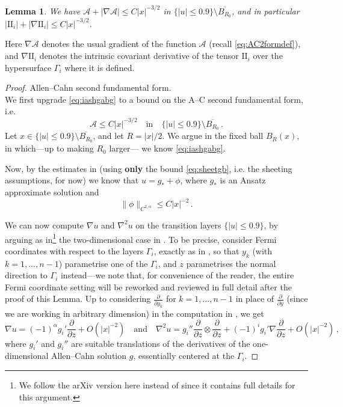 \documentclass{article}
\newtheorem{lemma}[theorem]{Lemma}
\theoremstyle{definition}
\begin{document}
\begin{lemma}\label{lem:2ffdec} We have
$\mathcal A+|\nabla \mathcal A|\leq C|x|^{-3/2}$ in $\{|u|\leq 0.9\}\setminus\overline{B_{R_0}}$, and in particular
$|\mathrm{II}_i|+|\nabla \mathrm{II}_i|\leq C|x|^{-3/2}$.
\end{lemma}
Here $\nabla \mathcal A$ denotes the usual gradient of the function $\mathcal A$ (recall \eqref{eq:AC2formdef}), and $\nabla \mathrm{II}_i$ denotes the intrinsic covariant derivative of the tensor $\mathrm{II}_i$ over the hypersurface $\Gamma_i$ where it is defined.
\begin{proof} 
 Allen--Cahn second fundamental form.\\
    We first upgrade \eqref{eq:iashgabg} to a bound on the A--C second fundamental form, i.e.
    \begin{equation}\label{eq:ehqbqbajf}
        \mathcal A\leq C|x|^{-3/2}\quad\mbox{in}\quad \{|u|\leq 0.9\}\setminus \overline{B_{R_0}}\,.
    \end{equation}
    Let $x\in \{|u|\leq 0.9\}\setminus \overline{B_{R_0}}$, and let $R=|x|/2$.  We argue in the fixed ball $B_R(x)$, in which---up to making $R_0$ larger--- we know \eqref{eq:iashgabg}.
    
    Now, by the estimates in \cite{WW19} (using \textbf{only} the bound \eqref{eq:sheetgb}, i.e. the sheeting assumptions, for now) we know that $u=g_*+\phi$, where $g_*$ is an Ansatz approximate solution and 
    $$\|\phi\|_{C^{2,\alpha}}\leq C|x|^{-2}\,.$$
    
    We can now compute $\nabla u$ and $\nabla^2 u$ on the transition layers $\{|u|\leq 0.9\}$, by arguing as in\footnote{We follow the arXiv version here instead of \cite{WW18} since it contains full details for this argument.} the two-dimensional case in \cite[page 45]{WW17arXiv}. To be precise, consider Fermi coordinates with respect to the layers $\Gamma_i$, exactly as in \cite{WW17arXiv}, so that $y_k$ (with $k=1,...,n-1$) parametrise one of the $\Gamma_i$, and $z$ parametrises the normal direction to $\Gamma_i$ instead---we note that, for convenience of the reader, the entire Fermi coordinate setting will be reworked and reviewed in full detail after the proof of this Lemma. Up to considering $\frac{\partial}{\partial y_k}$ for $k=1,...,n-1$ in place of $\frac{\partial}{\partial y}$ (since we are working in arbitrary dimension) in the computation in \cite[page 45]{WW17arXiv}, we get
    \begin{equation*}
        \nabla u = (-1)^\alpha g_i' \frac{\partial}{\partial z} +O(|x|^{-2})\quad\mbox{and}\quad \nabla^2 u =g_i'' \frac{\partial}{\partial z}\otimes\frac{\partial}{\partial z} +(-1)^i g_i' \nabla\frac{\partial}{\partial z} +O(|x|^{-2})\,,
    \end{equation*}
    where $g_i'$ and $g_i''$ are suitable translations of the derivatives of the one-dimensional Allen--Cahn solution $g$, essentially centered at the $\Gamma_i$.


\end{proof}
\end{document}
